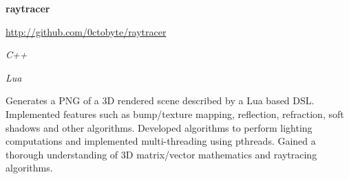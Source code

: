 \documentclass{article}
\newenvironment{name}{\fontfamily{phv}\selectfont\bfseries\normalsize}{\par}
\newenvironment{colorheading}{\fontfamily{phv}\selectfont\bfseries\normalsize\color{darkcyan}}{\par}
\newenvironment{genericbody}{\fontfamily{phv}\selectfont\small\raggedright}{\par}
\newenvironment{metadata}{\fontfamily{phv}\selectfont\itshape\small\color{darkgray}}{\par}
\newenvironment{experience}[2]%
{%
  \begin{minipage}{0.6\linewidth}\begin{flushleft}#1\end{flushleft}\end{minipage}%
  \hfill%
  \begin{minipage}{0.3\linewidth}\begin{flushright}#2\end{flushright}\end{minipage}%
}%
{}
\begin{document}
\begin{minipage}[t]{0.6\linewidth}
    \medskip
    \begin{experience}
    {
      \begin{colorheading}raytracer\end{colorheading}
      \begin{genericbody}\url{http://github.com/0ctobyte/raytracer}\end{genericbody}
    }
    {
      \begin{metadata}C++\end{metadata}
      \begin{metadata}Lua\end{metadata}
    }
    \end{experience}
    \begin{genericbody}
      Generates a PNG of a 3D rendered scene described by a Lua based DSL. Implemented features such as bump/texture
      mapping, reflection, refraction, soft shadows and other algorithms. Developed algorithms to perform lighting
      computations and implemented multi-threading using pthreads. Gained a thorough understanding of 3D matrix/vector
      mathematics and raytracing algorithms.
    \end{genericbody}
  \end{minipage}
\end{document}
